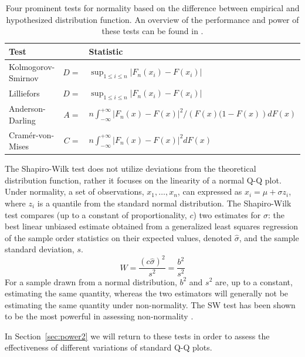\documentclass{article}\usepackage[]{graphicx}\usepackage[]{color}
\begin{document}
\begin{table}
\centering
\caption{\label{tab:tests} Four prominent tests for normality based on the difference between empirical and hypothesized distribution function. An overview of the performance and power of these tests can be found in \citet{stephens:1974}.}
\begin{tabular}{lrl}\hline
Test && Statistic\\\hline\hline
Kolmogorov-Smirnov & $D =$ & $ \sup_{1 \le i \le n} \left | F_n(x_i) - F(x_i)\right|$ \\
Lilliefors & $D =$ & $ \sup_{1 \le i \le n} \left | F_n(x_i) - F(x_i)\right|$ \\
Anderson-Darling & $A =$ & $ n \int_{-\infty}^{+\infty} \left | F_n(x) - F(x)\right|^2/\left(F(x)(1 - F(x)\right) dF(x)$\\
Cram\'{e}r-von-Mises & $C =$ & $n \int_{-\infty}^{+\infty} \left | F_n(x) - F(x)\right|^2 dF(x)$ \\\hline
\end{tabular}
\end{table}
%

The Shapiro-Wilk test \cite[SW-test,][]{Shapiro:1965kt} does not utilize deviations from the theoretical distribution function, rather it focuses on the linearity of a normal Q-Q plot. Under normality, a set of observations, $x_1, \ldots, x_n$, can expressed as $x_i = \mu + \sigma z_i$, where $z_i$ is a quantile from the standard normal distribution. The Shapiro-Wilk test compares (up to a constant of proportionality, $c$) two estimates for $\sigma$: the best linear unbiased estimate obtained from a generalized least squares regression of the sample order statistics on their expected values, denoted $\widehat{\sigma}$, and the sample standard deviation, $s$.
\[
  W = \frac{(c \widehat{\sigma})^2}{s^2} = \frac{b^2}{s^2}
\]
For a sample drawn from a normal distribution, $b^2$ and $s^2$ are, up to a constant, estimating the same quantity, whereas the two estimators will generally not be estimating the same quantity under non-normality. The SW test has been shown to be the most powerful in assessing non-normality \citep{stephens:1974, razali:2011}.

In Section~\ref{sec:power2} we will return to these tests in order to assess the effectiveness of different variations of standard Q-Q plots.
\end{document}
